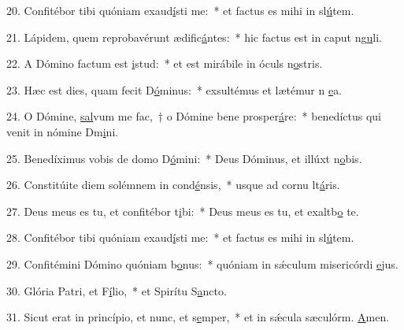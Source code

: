 20. Confitébor tibi quóniam exaud\uline{í}sti me:~* et factus es mihi in sl\uline{ú}tem.\par 
21. Lápidem, quem reprobavérunt ædific\uline{á}ntes:~* hic factus est in caput ng\uline{u}li.\par 
22. A Dómino factum est \uline{i}stud:~* et est mirábile in óculs n\uline{o}stris.\par 
23. Hæc est dies, quam fecit D\uline{ó}minus:~* exsultémus et lætémur n \uline{e}a.\par 
24. O Dómine, \uline{sal}vum me fac,~† o Dómine bene prosper\uline{á}re:~* benedíctus qui venit in nómine Dm\uline{i}ni.\par 
25. Benedíximus vobis de domo D\uline{ó}mini:~* Deus Dóminus, et illúxt n\uline{o}bis.\par 
26. Constitúite diem solémnem in cond\uline{é}nsis,~* usque ad cornu lt\uline{á}ris.\par 
27. Deus meus es tu, et confitébor t\uline{i}bi:~* Deus meus es tu, et exaltb\uline{o} te.\par 
28. Confitébor tibi quóniam exaud\uline{í}sti me:~* et factus es mihi in sl\uline{ú}tem.\par 
29. Confitémini Dómino quóniam b\uline{o}nus:~* quóniam in sǽculum misericórdi \uline{e}jus.\par 
30. Glória Patri, et F\uline{í}lio,~* et Spirítu S\uline{a}ncto.\par 
31. Sicut erat in princípio, et nunc, et s\uline{e}mper,~* et in sǽcula sæculórm. \uline{A}men.\par 
